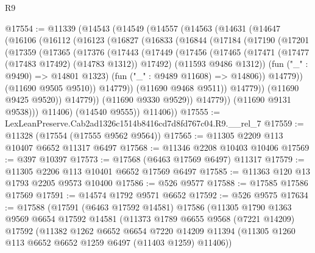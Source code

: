 \begin{lexlean}{R9}
\begin{coremodule}
@17554 := @11339
    (@14543
      (@14549
        (@14557
          (@14563
            (@14631
              (@14647
                (@16106
                  (@16112
                    (@16123
                      (@16827
                        (@16833
                          (@16844
                            (@17184
                              (@17190
                                (@17201
                                  (@17359
                                    (@17365
                                      (@17376
                                        (@17443
                                          (@17449
                                            (@17456
                                              (@17465
                                                (@17471
                                                  (@17477 (@17483 @17492) (@14783 @1312))
                                                  @17492)
                                                (@11593 @9486 @1312))
                                              (fun ("_" : @9490) => @14801 @1323)
                                              (fun ("_" : @9489 @11608) => @14806))
                                            @14779))
                                        (@11690 @9505 @9510))
                                      @14779))
                                  (@11690 @9468 @9511))
                                @14779))
                            (@11690 @9425 @9520))
                          @14779))
                      (@11690 @9330 @9529))
                    @14779))
                (@11690 @9131 @9538)))
            @11406)
          (@14540 @9555))
        @11406))
@17555 := LexLeanPreserve.Cab2ad1326c1514b8416cd7d8fd767c04.R9.__rel_7
@17559 := @11328 (@17554 (@17555 @9562 @9564))
@17565 := @11305 @2209 @113 @10407 @6652 @11317 @6497
@17568 := @11346 @2208 @10403 @10406
@17569 := @397 @10397
@17573 := @17568 (@6463 @17569 @6497) @11317
@17579 := @11305 @2206 @113 @10401 @6652 @17569 @6497
@17585 := @11363 @120 @13 @1793 @2205 @9573 @10400
@17586 := @526 @9577
@17588 := @17585 @17586 @17569
@17591 := @14574 @1792 @9571 @6652
@17592 := @526 @9575
@17634 := @17588
    (@17591
      (@6463 @17592 @14581)
      @17586
      (@11305
        @1790
        @1363
        @9569
        @6654
        @17592
        @14581
        (@11373
          @1789
          @6655
          @9568
          (@7221 @14209)
          @17592
          (@11382
            @1262
            @6652
            @6654
            @7220
            @14209
            @11394
            (@11305 @1260 @113 @6652 @6652 @1259 @6497 (@11403 @1259) @11406))

\end{coremodule}
\end{lexlean}
